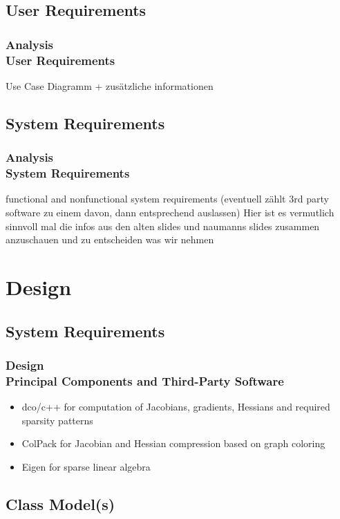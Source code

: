 \documentclass[ucs,10pt]{beamer}
\begin{document}
\subsection{User Requirements}

\begin{frame}
\frametitle{Analysis \\
	\small \color{rwth-blue} User Requirements}
	Use Case Diagramm
	+ zusätzliche informationen
\end{frame}

\subsection{System Requirements}

\begin{frame}
\frametitle{Analysis \\
	\small \color{rwth-blue} System Requirements}
	functional and nonfunctional system requirements (eventuell zählt 3rd party software zu einem davon, dann entsprechend auslassen)
	Hier ist es vermutlich sinnvoll mal die infos aus den alten slides und naumanns slides zusammen anzuschauen und zu entscheiden was wir nehmen
\end{frame}

\section{Design}

\subsection{System Requirements}

\begin{frame}
\frametitle{Design \\
	\small \color{rwth-blue} Principal Components and Third-Party Software}
	\begin{itemize}
	\item dco/c++ for computation of Jacobians, gradients, Hessians and required sparsity patterns
	\item ColPack for Jacobian and Hessian compression based on graph coloring
	\item Eigen for sparse linear algebra
	\end{itemize}
\end{frame}

\subsection{Class Model(s)}
\end{document}

